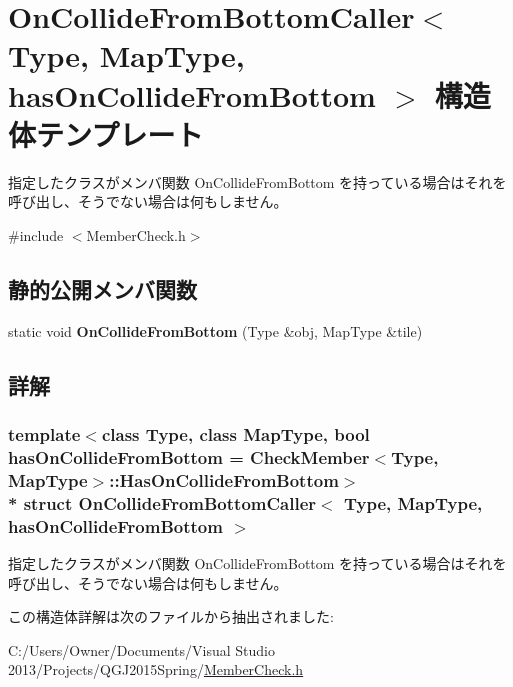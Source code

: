 \hypertarget{struct_on_collide_from_bottom_caller}{}\section{On\+Collide\+From\+Bottom\+Caller$<$ Type, Map\+Type, has\+On\+Collide\+From\+Bottom $>$ 構造体テンプレート}
\label{struct_on_collide_from_bottom_caller}


指定したクラスがメンバ関数 On\+Collide\+From\+Bottom を持っている場合はそれを呼び出し、そうでない場合は何もしません。 




{\ttfamily \#include $<$Member\+Check.\+h$>$}

\subsection*{静的公開メンバ関数}
\begin{DoxyCompactItemize}
\item 
static void {\bfseries On\+Collide\+From\+Bottom} (Type \&obj, Map\+Type \&tile)\hypertarget{struct_on_collide_from_bottom_caller_aea75e76ad1614f9c965e3c78c395469e}{}\label{struct_on_collide_from_bottom_caller_aea75e76ad1614f9c965e3c78c395469e}

\end{DoxyCompactItemize}


\subsection{詳解}
\subsubsection*{template$<$class Type, class Map\+Type, bool has\+On\+Collide\+From\+Bottom = Check\+Member$<$\+Type, Map\+Type$>$\+::\+Has\+On\+Collide\+From\+Bottom$>$\\*
struct On\+Collide\+From\+Bottom\+Caller$<$ Type, Map\+Type, has\+On\+Collide\+From\+Bottom $>$}

指定したクラスがメンバ関数 On\+Collide\+From\+Bottom を持っている場合はそれを呼び出し、そうでない場合は何もしません。



この構造体詳解は次のファイルから抽出されました\+:\begin{DoxyCompactItemize}
\item 
C\+:/\+Users/\+Owner/\+Documents/\+Visual Studio 2013/\+Projects/\+Q\+G\+J2015\+Spring/\hyperlink{_member_check_8h}{Member\+Check.\+h}\end{DoxyCompactItemize}
